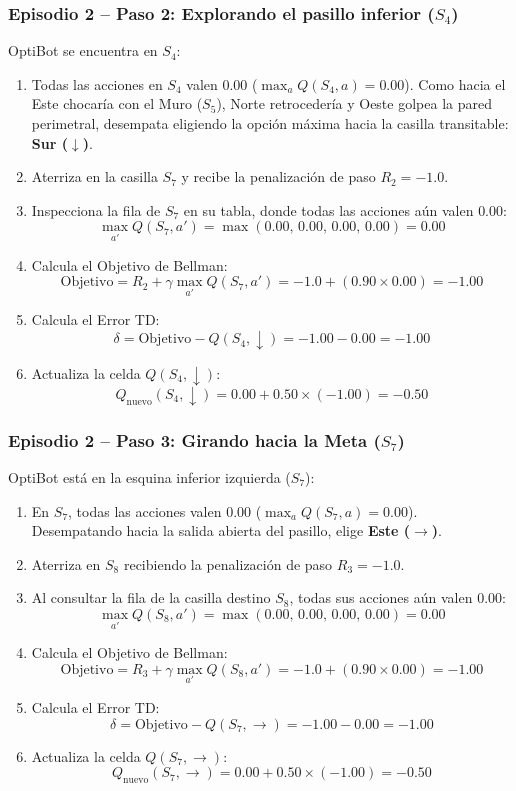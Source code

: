 \begin{calculomanual}
\subsubsection*{Episodio 2 -- Paso 2: Explorando el pasillo inferior ($S_4$)}
OptiBot se encuentra en $S_4$:
\begin{enumerate}
  \item Todas las acciones en $S_4$ valen $0.00$ ($\max_a Q(S_4, a) = 0.00$). Como hacia el Este chocaría con el Muro ($S_5$), Norte retrocedería y Oeste golpea la pared perimetral, desempata eligiendo la opción máxima hacia la casilla transitable: \textbf{Sur ($\downarrow$)}.
  \item Aterriza en la casilla $S_7$ y recibe la penalización de paso $R_2 = -1.0$.
  \item Inspecciona la fila de $S_7$ en su tabla, donde todas las acciones aún valen $0.00$:
  \[
    \max_{a'} Q(S_7, a') = \max(0.00, \, 0.00, \, 0.00, \, 0.00) = \mathbf{0.00}
  \]
  \item Calcula el Objetivo de Bellman:
  \[
    \text{Objetivo} = R_2 + \gamma \max_{a'} Q(S_7, a') = -1.0 + (0.90 \times 0.00) = \mathbf{-1.00}
  \]
  \item Calcula el Error TD:
  \[
    \delta = \text{Objetivo} - Q(S_4, \downarrow) = -1.00 - 0.00 = \mathbf{-1.00}
  \]
  \item Actualiza la celda $Q(S_4, \downarrow)$:
  \[
    Q_{\text{nuevo}}(S_4, \downarrow) = 0.00 + 0.50 \times (-1.00) = \mathbf{-0.50}
  \]
\end{enumerate}

\subsubsection*{Episodio 2 -- Paso 3: Girando hacia la Meta ($S_7$)}
OptiBot está en la esquina inferior izquierda ($S_7$):
\begin{enumerate}
  \item En $S_7$, todas las acciones valen $0.00$ ($\max_a Q(S_7, a) = 0.00$). Desempatando hacia la salida abierta del pasillo, elige \textbf{Este ($\rightarrow$)}.
  \item Aterriza en $S_8$ recibiendo la penalización de paso $R_3 = -1.0$.
  \item Al consultar la fila de la casilla destino $S_8$, todas sus acciones aún valen $0.00$:
  \[
    \max_{a'} Q(S_8, a') = \max(0.00, \, 0.00, \, 0.00, \, 0.00) = \mathbf{0.00}
  \]
  \item Calcula el Objetivo de Bellman:
  \[
    \text{Objetivo} = R_3 + \gamma \max_{a'} Q(S_8, a') = -1.0 + (0.90 \times 0.00) = \mathbf{-1.00}
  \]
  \item Calcula el Error TD:
  \[
    \delta = \text{Objetivo} - Q(S_7, \rightarrow) = -1.00 - 0.00 = \mathbf{-1.00}
  \]
  \item Actualiza la celda $Q(S_7, \rightarrow)$:
  \[
    Q_{\text{nuevo}}(S_7, \rightarrow) = 0.00 + 0.50 \times (-1.00) = \mathbf{-0.50}
  \]
\end{enumerate}


\end{calculomanual}
